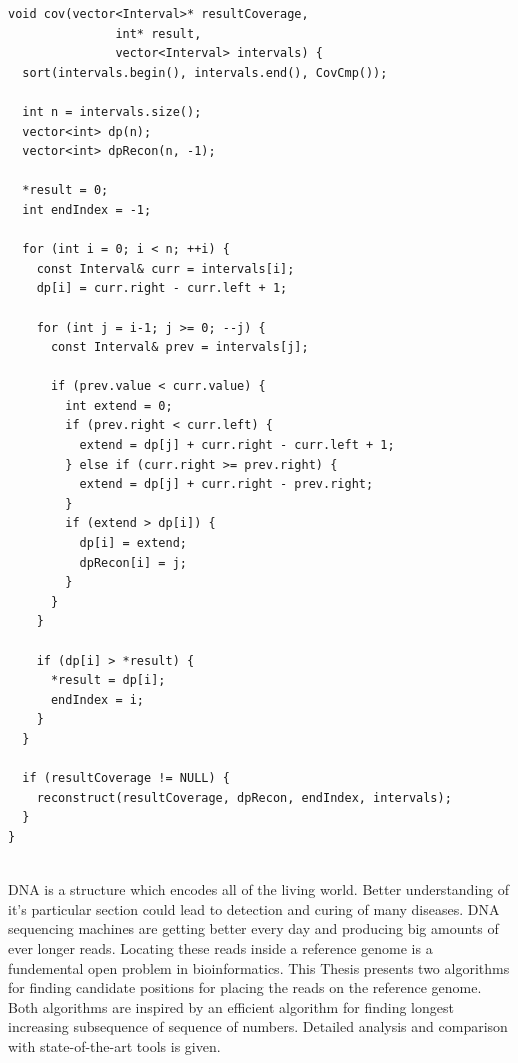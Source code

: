\documentclass[times, utf8, diplomski]{fer}
\begin{document}
\begin{algorithm}[H]
\begin{lstlisting}
void cov(vector<Interval>* resultCoverage,
               int* result,
               vector<Interval> intervals) {
  sort(intervals.begin(), intervals.end(), CovCmp());

  int n = intervals.size();
  vector<int> dp(n);
  vector<int> dpRecon(n, -1);

  *result = 0;
  int endIndex = -1;

  for (int i = 0; i < n; ++i) {
    const Interval& curr = intervals[i];
    dp[i] = curr.right - curr.left + 1;

    for (int j = i-1; j >= 0; --j) {
      const Interval& prev = intervals[j];

      if (prev.value < curr.value) {
        int extend = 0;
        if (prev.right < curr.left) {
          extend = dp[j] + curr.right - curr.left + 1;
        } else if (curr.right >= prev.right) {
          extend = dp[j] + curr.right - prev.right;
        }
        if (extend > dp[i]) {
          dp[i] = extend;
          dpRecon[i] = j;
        }
      }
    }

    if (dp[i] > *result) {
      *result = dp[i];
      endIndex = i;
    }
  }

  if (resultCoverage != NULL) {
    reconstruct(resultCoverage, dpRecon, endIndex, intervals);
  }
}


\end{lstlisting}
\end{algorithm}

\nocite{Pabinger21012013}
\nocite{Johnson:2008:BAU:1593105.1593117}
\nocite{matplotlib}
\nocite{ukkonen}




\begin{sazetak}
DNA is a structure which encodes all of the living world. Better understanding of it's particular section could lead to detection and curing of many diseases. DNA sequencing machines are getting better every day and producing
big amounts of ever longer reads. Locating these reads inside a reference genome is a fundemental open problem in bioinformatics. This Thesis presents two algorithms for finding candidate positions for placing the reads on the reference genome. Both algorithms are inspired by an efficient algorithm for finding longest increasing subsequence of sequence of numbers. Detailed analysis and comparison with state-of-the-art tools is given.

\end{sazetak}
\end{document}
